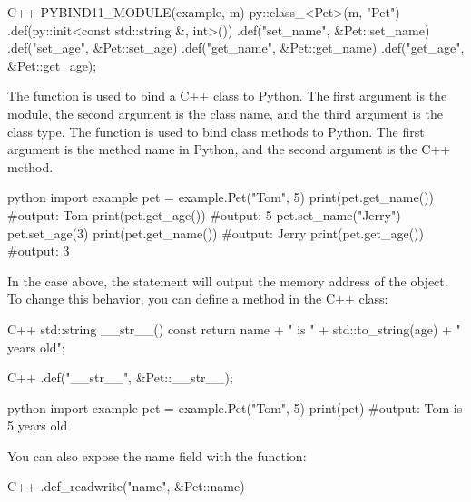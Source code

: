 \begin{neonlisting}[language=C++]{C++}
    PYBIND11_MODULE(example, m) {
        py::class_<Pet>(m, "Pet")
            .def(py::init<const std::string &, int>())
            .def("set_name", &Pet::set_name)
            .def("set_age", &Pet::set_age)
            .def("get_name", &Pet::get_name)
            .def("get_age", &Pet::get_age);
    }
\end{neonlisting}

The  function is used to bind a C++ class to Python. The first argument is the module, the second argument is the class name, and the third argument is the class type. The  function is used to bind class methods to Python. The first argument is the method name in Python, and the second argument is the C++ method.

\begin{neonlisting}{python}
    import example
    pet = example.Pet("Tom", 5)
    print(pet.get_name()) #output: Tom
    print(pet.get_age()) #output: 5
    pet.set_name("Jerry")
    pet.set_age(3)
    print(pet.get_name()) #output: Jerry
    print(pet.get_age()) #output: 3
\end{neonlisting}

In the case above, the  statement will output the memory address of the object. To change this behavior, you can define a  method in the C++ class:

\begin{neonlisting}[language=C++]{C++}
    std::string __str__() const {
        return name + " is " + std::to_string(age) + " years old";
    }
\end{neonlisting}

\begin{neonlisting}[language=C++]{C++}
    .def("__str__", &Pet::__str__);
\end{neonlisting}

\begin{neonlisting}{python}
    import example
    pet = example.Pet("Tom", 5)
    print(pet) #output: Tom is 5 years old
\end{neonlisting}

You can also expose the name field with the  function:

\begin{neonlisting}[language=C++]{C++}
    .def_readwrite("name", &Pet::name)
\end{neonlisting}

